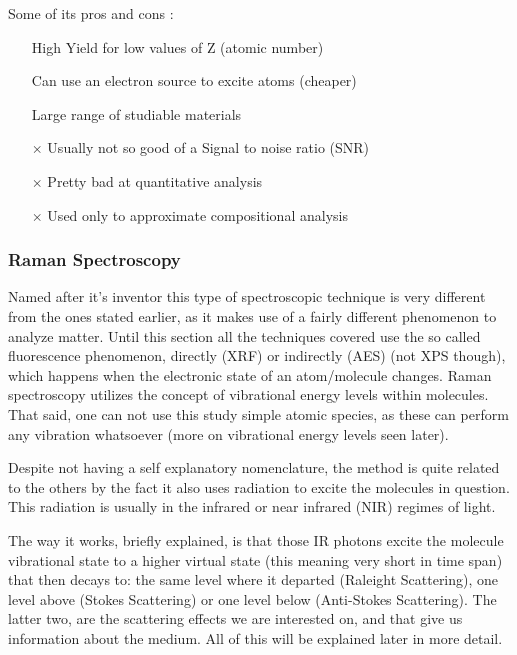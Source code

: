 \documentclass[]{article}
\begin{document}
\newpage

Some of its pros and cons \cite{TH_Many}:
\begin{itemize}
\item[\checkmark] High Yield for low values of Z (atomic number)
\item[\checkmark] Can use an electron source to excite atoms (cheaper)
\item[\checkmark] Large range of studiable materials
\item[$\times$] Usually not so good of a Signal to noise ratio (SNR)
\item[$\times$] Pretty bad at quantitative analysis
\item[$\times$] Used only to approximate compositional analysis
\end{itemize}

\subsubsection{Raman Spectroscopy}
Named after it's inventor this type of spectroscopic technique is very different from the ones stated earlier, as it makes use of a fairly different phenomenon to analyze matter. Until this section all the techniques covered use the so called fluorescence phenomenon, directly (XRF) or indirectly (AES) (not XPS though), which happens when the electronic state of an atom/molecule changes. Raman spectroscopy utilizes the concept of vibrational energy levels within molecules. That said, one can not use this study simple atomic species, as these can perform any vibration whatsoever (more on vibrational energy levels seen later).
\par Despite not having a self explanatory nomenclature, the method is quite related to the others by the fact it also uses radiation to excite the molecules in question. This radiation is usually in the infrared or near infrared (NIR) regimes of light.
\par The way it works, briefly explained, is that those IR photons excite the molecule vibrational state to a higher virtual state (this meaning very short in time span) that then decays to: the same level where it departed (Raleight Scattering), one level above (Stokes Scattering) or one level below (Anti-Stokes Scattering). The latter two, are the scattering effects we are interested on, and that give us information about the medium. All of this will be explained later in more detail.\\
\end{document}

